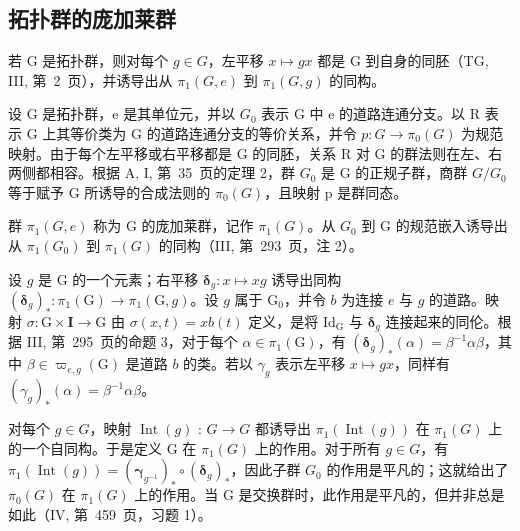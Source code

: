 \subsection{拓扑群的庞加莱群}

若 G 是拓扑群，则对每个 \(g \in G\)，左平移 \(x \mapsto gx\) 都是 G 到自身的同胚（TG, III, 第~2~页），并诱导出从 \(\pi_{1}(G, e)\) 到 \(\pi_{1}(G, g)\) 的同构。

设 G 是拓扑群，e 是其单位元，并以 \(G_{0}\) 表示 G 中 e 的道路连通分支。以 R 表示 G 上其等价类为 G 的道路连通分支的等价关系，并令 \(p: G \to \pi_{0}(G)\) 为规范映射。由于每个左平移或右平移都是 G 的同胚，关系 R 对 G 的群法则在左、右两侧都相容。根据 A, I, 第~35~页的定理 2，群 \(G_{0}\) 是 G 的正规子群，商群 \(G/G_{0}\) 等于赋予 G 所诱导的合成法则的 \(\pi_{0}(G)\)，且映射 p 是群同态。

群 \(\pi_{1}(G,e)\) 称为 G 的庞加莱群，记作 \(\pi_{1}(G)\)。从 \(G_{0}\) 到 G 的规范嵌入诱导出从 \(\pi_{1}(G_{0})\) 到 \(\pi_{1}(G)\) 的同构（III, 第~293~页，注 2）。

设 \(g\) 是 G 的一个元素；右平移 \(\boldsymbol{\delta}_g \colon x \mapsto xg\) 诱导出同构 \((\boldsymbol{\delta}_g)_* \colon \pi_1(\mathrm{G}) \to \pi_1(\mathrm{G}, g)\)。设 \(g\) 属于 \(\mathrm{G}_0\)，并令 \(b\) 为连接 \(e\) 与 \(g\) 的道路。映射 \(\sigma \colon \mathrm{G} \times \mathbf{I} \to \mathrm{G}\) 由 \(\sigma(x, t) = xb(t)\) 定义，是将 \(\mathrm{Id}_{\mathrm{G}}\) 与 \(\boldsymbol{\delta}_g\) 连接起来的同伦。根据 III, 第~295~页的命题 3，对于每个 \(\alpha \in \pi_1(\mathrm{G})\)，有 \((\boldsymbol{\delta}_g)_*(\alpha) = \beta^{-1}\alpha\beta\)，其中 \(\beta \in \varpi_{e,g}(\mathrm{G})\) 是道路 \(b\) 的类。若以 \(\gamma_g\) 表示左平移 \(x \mapsto gx\)，同样有 \((\gamma_g)_*(\alpha) = \beta^{-1}\alpha\beta\)。

对每个 \(g \in G\)，映射 \(\operatorname{Int}(g)\) : \(G \to G\) 都诱导出 \(\pi_{1}(\operatorname{Int}(g))\) 在 \(\pi_{1}(G)\) 上的一个自同构。于是定义 G 在 \(\pi_{1}(G)\) 上的作用。对于所有 \(g \in G\)，有 \(\pi_{1}(\operatorname{Int}(g)) = (\boldsymbol{\gamma}_{g^{-1}})_{*} \circ (\boldsymbol{\delta}_{g})_{*}\)，因此子群 \(G_{0}\) 的作用是平凡的；这就给出了 \(\pi_{0}(G)\) 在 \(\pi_{1}(G)\) 上的作用。当 G 是交换群时，此作用是平凡的，但并非总是如此（IV, 第~459~页，习题 1）。

